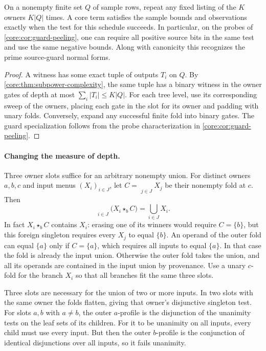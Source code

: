 \begin{corollary}\label{core:cor:owner-fold-schedule}
On a nonempty finite set $Q$ of sample rows, repeat any fixed listing
of the $K$ owners $K|Q|$ times. A core term satisfies the sample bounds
and observations exactly when the test for this schedule succeeds.
In particular, on the probes of \cref{core:cor:guard-peeling}, one can
require all positive source bits in the same test and use the same
negative bounds. Along with canonicity this recognizes the prime
source-guard normal forms.
\end{corollary}
\begin{proof}
A witness has some exact tuple of outputs $T_i$ on $Q$. By
\cref{core:thm:subpower-complexity}, the same tuple has a binary witness
in the owner gates of depth at most $\sum_i|T_i|\leq K|Q|$.
For each tree level, use its corresponding sweep of the owners,
placing each gate in the slot for its owner and padding with unary
folds. Conversely, expand any successful finite fold into binary
gates. The guard specialization follows from the probe characterization
in \cref{core:cor:guard-peeling}.
\end{proof}

\paragraph{Changing the measure of depth.}
Three owner slots suffice for an arbitrary nonempty union. For distinct
owners $a,b,c$ and input menus $(X_i)_{i\in J}$, let
$C=\mathop{\star_c}\limits_{j\in J} X_j$ be their nonempty fold at $c$.
Then
\begin{equation}\label{core:eq:three-fold-union}
 \mathop{\star_a}\limits_{i\in J}\bigl(X_i\star_b C\bigr)
      =\bigcup_{i\in J}X_i .
\end{equation}
In fact $X_i\star_b C$ contains $X_i$: erasing one of its winners would
require $C=\{b\}$, but this foreign singleton requires every $X_j$ to
equal $\{b\}$. An operand of the outer fold can equal $\{a\}$ only if
$C=\{a\}$, which requires all inputs to equal $\{a\}$. In that case
the fold is already the input union. Otherwise the outer fold takes the
union, and all its operands are contained in the input union by
provenance. Use a unary $c$-fold for the branch $X_i$ so that all
branches fit the same three slots.

Three slots are necessary for the union of two or more inputs. In two
slots with the same owner the folds flatten, giving that owner's
disjunctive singleton test. For slots $a,b$ with $a\ne b$, the outer
$a$-profile is the disjunction of the unanimity tests on the leaf sets
of its children. For it to be unanimity on all inputs, every child
must use every input. But then the outer $b$-profile is the conjunction
of identical disjunctions over all inputs, so it fails unanimity.

